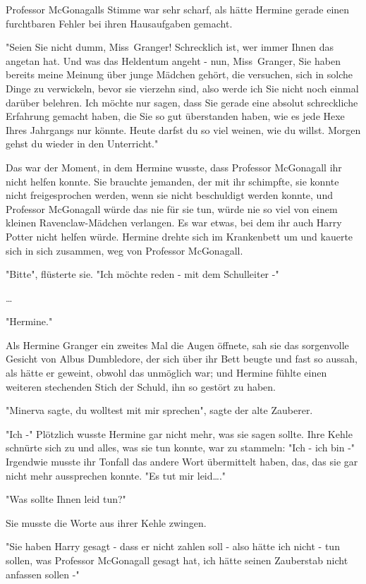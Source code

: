 {Professor McGonagalls Stimme war sehr scharf, als hätte Hermine gerade einen furchtbaren Fehler bei ihren Hausaufgaben gemacht.

"Seien Sie nicht dumm, Miss~Granger! Schrecklich ist, wer immer Ihnen das angetan hat. Und was das Heldentum angeht - nun, Miss~Granger, Sie haben bereits meine Meinung über junge Mädchen gehört, die versuchen, sich in solche Dinge zu verwickeln, bevor sie vierzehn sind, also werde ich Sie nicht noch einmal darüber belehren. Ich möchte nur sagen, dass Sie gerade eine absolut schreckliche Erfahrung gemacht haben, die Sie so gut überstanden haben, wie es jede Hexe Ihres Jahrgangs nur könnte. Heute darfst du so viel weinen, wie du willst. Morgen gehst du wieder in den Unterricht."

Das war der Moment, in dem Hermine wusste, dass Professor McGonagall ihr nicht helfen konnte. Sie brauchte jemanden, der mit ihr schimpfte, sie konnte nicht freigesprochen werden, wenn sie nicht beschuldigt werden konnte, und Professor McGonagall würde das nie für sie tun, würde nie so viel von einem kleinen Ravenclaw-Mädchen verlangen. Es war etwas, bei dem ihr auch Harry Potter nicht helfen würde. Hermine drehte sich im Krankenbett um und kauerte sich in sich zusammen, weg von Professor McGonagall.

"Bitte", flüsterte sie. "Ich möchte reden - mit dem Schulleiter -"

…

"Hermine."

Als Hermine Granger ein zweites Mal die Augen öffnete, sah sie das sorgenvolle Gesicht von Albus Dumbledore, der sich über ihr Bett beugte und fast so aussah, als hätte er geweint, obwohl das unmöglich war; und Hermine fühlte einen weiteren stechenden Stich der Schuld, ihn so gestört zu haben.

"Minerva sagte, du wolltest mit mir sprechen", sagte der alte Zauberer.

"Ich -" Plötzlich wusste Hermine gar nicht mehr, was sie sagen sollte. Ihre Kehle schnürte sich zu und alles, was sie tun konnte, war zu stammeln: "Ich - ich bin -" Irgendwie musste ihr Tonfall das andere Wort übermittelt haben, das, das sie gar nicht mehr aussprechen konnte. "Es tut mir leid…."

"Was sollte Ihnen leid tun?"

Sie musste die Worte aus ihrer Kehle zwingen.

"Sie haben Harry gesagt - dass er nicht zahlen soll - also hätte ich nicht - tun sollen, was Professor McGonagall gesagt hat, ich hätte seinen Zauberstab nicht anfassen sollen -"

}
